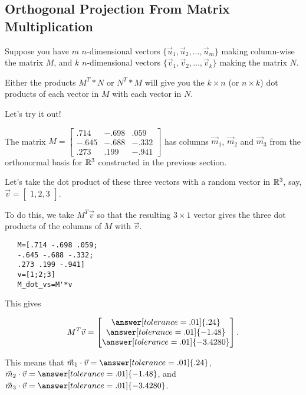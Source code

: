 \documentclass{ximera}
\begin{document}
\subsection*{Orthogonal Projection From Matrix Multiplication}

Suppose you have $m$ $n$-dimensional vectors $\lbrace \vec{u}_1, \vec{u}_2, \ldots, \vec{u}_m\rbrace$ making column-wise the matrix $M$, and $k$ $n$-dimensional vectors $\lbrace \vec{v}_1, \vec{v}_2, \ldots, \vec{v}_k\rbrace$ making the matrix $N$. 

Either the products $M^T*N$ or $N^T*M$ will give you the $k\times n$ (or $n\times k$) dot products of each vector in $M$ with each vector in $N$.

Let's try it out!

\begin{example}

   The matrix $M=\begin{bmatrix}
         .714 & -.698 &.059\\-.645&-.688&-.332\\.273&.199&-.941
      \end{bmatrix}$ has columns $\vec{m}_1$, $\vec{m}_2$ and $\vec{m}_3$ from the orthonormal basis for $\mathbb{R}^3$ constructed in the previous section. 

   Let's take the dot product of these three vectors with a random vector in $\mathbb{R}^3$, say, $\vec{v}=\begin{bmatrix}
      1, 2, 3
   \end{bmatrix}$. 

   To do this, we take $M^T\vec{v}$ so that the resulting $3\times 1$ vector gives the three dot products of the columns of $M$ with $\vec{v}$.

   \begin{verbatim}
   M=[.714 -.698 .059;
   -.645 -.688 -.332;
   .273 .199 -.941]
   v=[1;2;3]
   M_dot_vs=M'*v
   \end{verbatim}
   
   This gives

   $$M^T\vec{v}=\begin{bmatrix}
      \answer[tolerance=.01]{.24}\\\answer[tolerance=.01]{-1.48}\\\answer[tolerance=.01]{-3.4280}
   \end{bmatrix}.$$

   This means that $\vec{m}_1\cdot \vec{v}=\answer[tolerance=.01]{.24}$, $\vec{m}_2\cdot\vec{v}=\answer[tolerance=.01]{-1.48}$, and $\vec{m}_3\cdot\vec{v}=\answer[tolerance=.01]{-3.4280}$.


\end{example}
\end{document}
